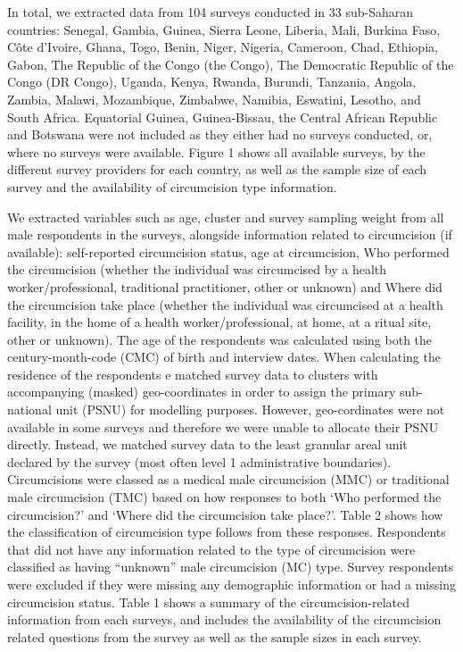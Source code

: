 \documentclass{article}
\begin{document}
\begin{appendix}
In total, we extracted data from 104 surveys conducted in 33 sub-Saharan countries: Senegal, Gambia, Guinea, Sierra Leone, Liberia, Mali, Burkina Faso, Côte d’Ivoire, Ghana, Togo, Benin, Niger, Nigeria, Cameroon, Chad, Ethiopia, Gabon, The Republic of the Congo (the Congo), The Democratic Republic of the Congo (DR Congo), Uganda, Kenya, Rwanda, Burundi, Tanzania, Angola, Zambia, Malawi, Mozambique, Zimbabwe, Namibia, Eswatini, Lesotho, and South Africa. {\color{red}Equatorial Guinea, Guinea-Bissau, the Central African Republic and Botswana were not included as they either had no surveys conducted, or, where no surveys were available.} Figure 1 shows all available surveys, by the different survey providers for each country, as well as the sample size of each survey and the availability of circumcision type information. 

We extracted variables such as age, cluster and survey sampling weight from all male respondents in the surveys, alongside information related to circumcision (if available): self-reported circumcision status, age at circumcision, Who performed the circumcision (whether the individual was circumcised by a health worker/professional, traditional practitioner, other or unknown) and Where did the circumcision take place (whether the individual was circumcised at a health facility, in the home of a health worker/professional, at home, at a ritual site, other or unknown). The age of the respondents was calculated using both the century-month-code (CMC) of birth and interview dates. When calculating the residence of the respondents e matched survey data to clusters with accompanying (masked) geo-coordinates in order to assign the primary sub-national unit (PSNU) for modelling purposes. However, geo-cordinates were not available in some surveys and therefore we were unable to allocate their PSNU directly. Instead, we matched survey data to the least granular areal unit declared by the survey (most often level 1 administrative boundaries). Circumcisions were classed as a medical male circumcision (MMC) or traditional male circumcision (TMC) based on how responses to both ‘Who performed the circumcision?’ and ‘Where did the circumcision take place?’. Table 2 shows how the classification of circumcision type follows from these responses. Respondents that did not have any information related to the type of circumcision were classified as having “unknown” male circumcision (MC) type. Survey respondents were excluded if they were missing any demographic information or had a missing circumcision status. Table 1 shows a summary of the circumcision-related information from each surveys, and includes the availability of the circumcision related questions from the survey as well as the sample sizes in each survey. %


\end{appendix}
\end{document}
